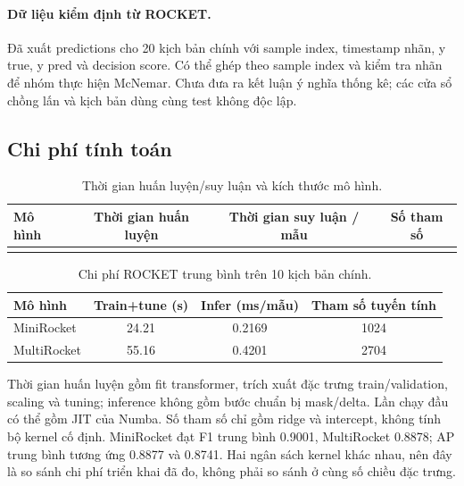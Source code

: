 \paragraph{Dữ liệu kiểm định từ ROCKET.} Đã xuất predictions cho 20 kịch bản chính với sample index, timestamp nhãn, y true, y pred và decision score. Có thể ghép theo sample index và kiểm tra nhãn để nhóm thực hiện McNemar. Chưa đưa ra kết luận ý nghĩa thống kê; các cửa sổ chồng lấn và kịch bản dùng cùng test không độc lập.

\subsection{Chi phí tính toán}
\label{sec:chi-phi-tinh-toan}

\begin{table}[H]
\centering
\caption{Thời gian huấn luyện/suy luận và kích thước mô hình.}
\label{tab:chi-phi-tinh-toan}
\begin{tabular}{@{}lccc@{}}
\toprule
\textbf{Mô hình} & \textbf{Thời gian huấn luyện} & \textbf{Thời gian suy luận / mẫu} & \textbf{Số tham số} \\
\midrule
\TODO{} & \TODO{} & \TODO{} & \TODO{} \\
\bottomrule
\end{tabular}
\end{table}

\begin{table}[H]
\centering
\small
\caption{Chi phí ROCKET trung bình trên 10 kịch bản chính.}
\label{tab:rocket-cost}
\begin{tabular}{@{}lccc@{}}
\toprule
\textbf{Mô hình} & \textbf{Train+tune (s)} & \textbf{Infer (ms/mẫu)} & \textbf{Tham số tuyến tính} \\
\midrule
MiniRocket & 24.21 & 0.2169 & 1024 \\
MultiRocket & 55.16 & 0.4201 & 2704 \\
\bottomrule
\end{tabular}
\end{table}
Thời gian huấn luyện gồm fit transformer, trích xuất đặc trưng train/validation, scaling và tuning; inference không gồm bước chuẩn bị mask/delta. Lần chạy đầu có thể gồm JIT của Numba. Số tham số chỉ gồm ridge và intercept, không tính bộ kernel cố định. MiniRocket đạt F1 trung bình 0.9001, MultiRocket 0.8878; AP trung bình tương ứng 0.8877 và 0.8741. Hai ngân sách kernel khác nhau, nên đây là so sánh chi phí triển khai đã đo, không phải so sánh ở cùng số chiều đặc trưng.

